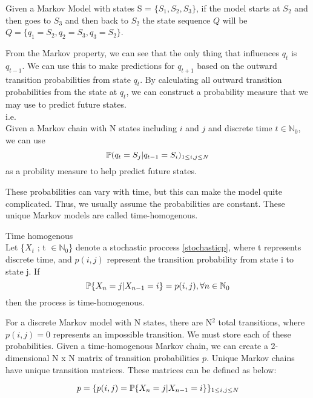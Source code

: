 \begin{example}
    \label{stateseq}
    Given a Markov Model with states S = $\{S_1,S_2,S_3\}$, if the model starts at $S_2$ and then goes to $S_3$ and then back to $S_2$ the state sequence $Q$ will be $Q = \{q_1 = S_2, q_2 = S_3, q_3 = S_2\}$.
\end{example}

From the Markov property, we can see that the only thing that influences $q_t$ is $q_{t-1}$. We can use this to make predictions for $q_{t+1}$ based on the outward transition probabilities from state $q_t$. By calculating all outward transition probabilities from the state at $q_t$, we can construct a probability measure that we may use to predict future states.
\\
i.e. 
\\
Given a Markov chain with N states including $i$ and $j$ and discrete time $t \in \mathbb{N}_0$, we can use 
\begin{equation}
    \label{probmeas}
    \mathbb{P} (q_t = S_j | q_{t-1} = S_i)_{1 \leq i,j \leq N}
\end{equation}
as a probility measure to help predict future states.

These probabilities can vary with time, but this can make the model quite complicated. Thus, we usually assume the probabilities are constant. These unique Markov models are called time-homogenous. 

\begin{definition}
\label{timehomogenous}
    Time homogenous \\
    Let \{$X_t$ ; t $\in \mathbb{N}_0$\} denote a stochastic proccess \ref{stochasticp}, where t represents discrete time, and $p(i,j)$ represent the transition probability from state i to state j. If 
    \begin{equation}
        \mathbb{P} \{X_n = j | X_{n-1} = i\} = p(i,j),       \forall n \in \mathbb{N}_0
    \end{equation}
    then the process is time-homogenous.
\end{definition}

For a discrete Markov model with N states, there are N$^2$ total transitions, where $p(i,j) = 0$ represents an impossible transition. We must store each of these probabilities. Given a time-homogenous Markov chain, we can create a 2-dimensional N x N matrix of transition probabilities $p$. Unique Markov chains have unique transition matrices. These matrices can be defined as below:

\begin{equation}
    \label{pmat}
    p = \{ p(i,j) = \mathbb{P} \{ X_n = j | X_{n-1} = i \}\}_{1 \leq i,j \leq N}
\end{equation}

